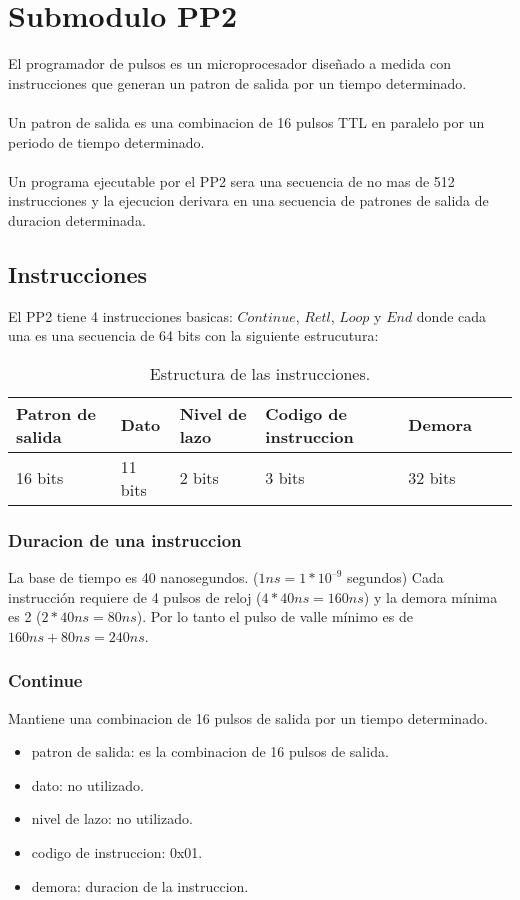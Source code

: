 \section{Submodulo PP2}

El programador de pulsos es un microprocesador diseñado a medida con instrucciones que generan
un patron de salida por un tiempo determinado.
\\\\
Un patron de salida es una combinacion de 16 pulsos TTL en paralelo por un periodo 
de tiempo determinado.
\\\\
Un programa ejecutable por el PP2 sera una secuencia de no mas de 512 instrucciones 
y la ejecucion derivara en una secuencia de patrones de salida de duracion determinada.

\subsection{Instrucciones}

El PP2 tiene 4 instrucciones basicas: $Continue$, $Retl$, $Loop$ y $End$ donde
cada una es una secuencia de 64 bits con la siguiente estrucutura:\\
\begin{table}[ht]
    \centering
    \begin{tabular}{|l|l|l|l|l|l|l|}
    \hline
    Patron de salida  & Dato & Nivel de lazo & Codigo de instruccion & Demora \\
    \hline
    16 bits & 11 bits & 2 bits & 3 bits & 32 bits\\
    \hline
\end{tabular}
\caption{\label{tab:pp2_ins}Estructura de las instrucciones.}
\end{table}


\subsubsection{Duracion de una instruccion}
La base de tiempo es 40 nanosegundos. ($1ns = 1*10^{–9}$ segundos) 
Cada instrucción requiere de 4 pulsos de reloj ($4 * 40ns = 160ns$) 
y la demora mínima es 2 ($2 * 40ns = 80ns$). Por lo tanto el pulso de
valle mínimo es de $160ns + 80ns = 240ns$.

\subsubsection{Continue}
Mantiene una combinacion de 16 pulsos de salida por un tiempo determinado.
\begin{itemize}
    \item patron de salida: es la combinacion de 16 pulsos de salida.
    \item dato: no utilizado.
    \item nivel de lazo: no utilizado.
    \item codigo de instruccion: 0x01.
    \item demora: duracion de la instruccion.
\end{itemize}

